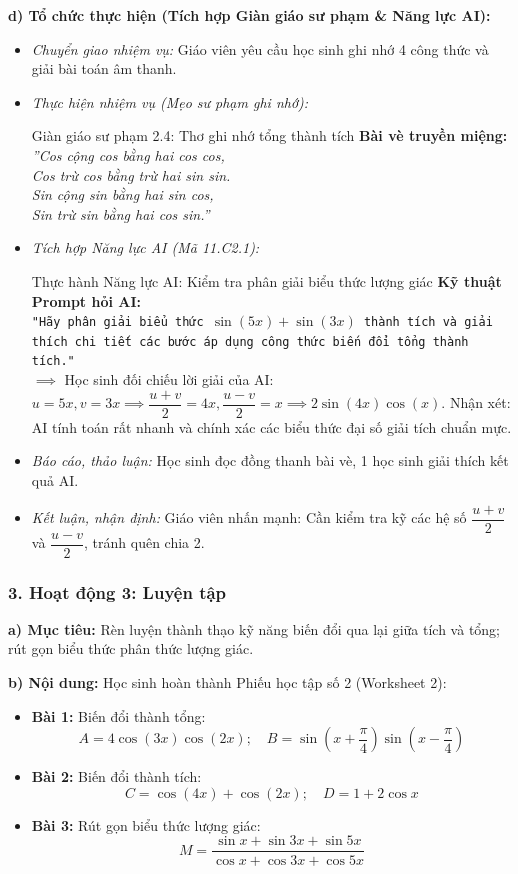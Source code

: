 \documentclass[12pt, a4paper]{article}
\begin{document}
\textbf{d) Tổ chức thực hiện (Tích hợp Giàn giáo sư phạm & Năng lực AI):}
\begin{itemize}[leftmargin=0.6cm]
    \item \textit{Chuyển giao nhiệm vụ:} Giáo viên yêu cầu học sinh ghi nhớ 4 công thức và giải bài toán âm thanh.
    \item \textit{Thực hiện nhiệm vụ (Mẹo sư phạm ghi nhớ):}
    \begin{scaffoldbox}{Giàn giáo sư phạm 2.4: Thơ ghi nhớ tổng thành tích}
        \textbf{Bài vè truyền miệng:}\\
        \textit{''Cos cộng cos bằng hai cos cos,}\\
        \textit{Cos trừ cos bằng trừ hai sin sin.}\\
        \textit{Sin cộng sin bằng hai sin cos,}\\
        \textit{Sin trừ sin bằng hai cos sin.''}
    \end{scaffoldbox}
    \item \textit{Tích hợp Năng lực AI (Mã 11.C2.1):}
    \begin{aibox}{Thực hành Năng lực AI: Kiểm tra phân giải biểu thức lượng giác}
        \textbf{Kỹ thuật Prompt hỏi AI:}\\
        \texttt{"Hãy phân giải biểu thức $\sin(5x) + \sin(3x)$ thành tích và giải thích chi tiết các bước áp dụng công thức biến đổi tổng thành tích."}\\
        $\implies$ Học sinh đối chiếu lời giải của AI: $u = 5x, v = 3x \implies \dfrac{u + v}{2} = 4x, \dfrac{u - v}{2} = x \implies 2\sin(4x)\cos(x)$. Nhận xét: AI tính toán rất nhanh và chính xác các biểu thức đại số giải tích chuẩn mực.
    \end{aibox}
    \item \textit{Báo cáo, thảo luận:} Học sinh đọc đồng thanh bài vè, 1 học sinh giải thích kết quả AI.
    \item \textit{Kết luận, nhận định:} Giáo viên nhấn mạnh: Cần kiểm tra kỹ các hệ số $\dfrac{u + v}{2}$ và $\dfrac{u - v}{2}$, tránh quên chia 2.
\end{itemize}

\subsubsection*{3. Hoạt động 3: Luyện tập}
\textbf{a) Mục tiêu:} Rèn luyện thành thạo kỹ năng biến đổi qua lại giữa tích và tổng; rút gọn biểu thức phân thức lượng giác.

\textbf{b) Nội dung:} Học sinh hoàn thành Phiếu học tập số 2 (Worksheet 2):
\begin{itemize}[leftmargin=0.6cm]
    \item \textbf{Bài 1:} Biến đổi thành tổng:
    $$A = 4\cos(3x) \cos(2x); \quad B = \sin\left(x + \dfrac{\pi}{4}\right) \sin\left(x - \dfrac{\pi}{4}\right)$$
    \item \textbf{Bài 2:} Biến đổi thành tích:
    $$C = \cos(4x) + \cos(2x); \quad D = 1 + 2\cos x$$
    \item \textbf{Bài 3:} Rút gọn biểu thức lượng giác:
    $$M = \dfrac{\sin x + \sin 3x + \sin 5x}{\cos x + \cos 3x + \cos 5x}$$
\end{itemize}
\end{document}
